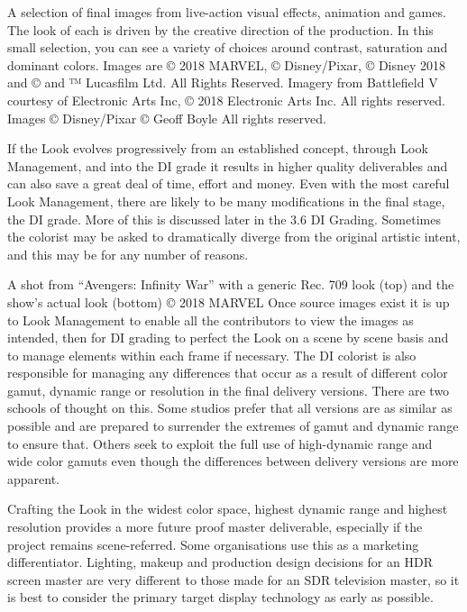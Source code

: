 A selection of final images from live-action visual effects, animation and games. The look of each is driven by the creative direction of the production. In this small selection, you can see a variety of choices around contrast, saturation and dominant colors.
Images are © 2018 MARVEL, © Disney/Pixar,  © Disney 2018 and © and ™ Lucasfilm Ltd. All Rights Reserved. Imagery from Battlefield V courtesy of Electronic Arts Inc, © 2018 Electronic Arts Inc. All rights reserved. Images © Disney/Pixar © Geoff Boyle All rights reserved.

If the Look evolves progressively from an established concept, through Look Management, and into the DI grade it results in higher quality deliverables and can also save a great deal of time, effort and money. Even with the most careful Look Management, there are likely to be many modifications in the final stage, the DI grade. More of this is discussed later in the 3.6 DI Grading. Sometimes the colorist may be asked to dramatically diverge from the original artistic intent, and this may be for any number of reasons. 





A shot from “Avengers: Infinity War” with a generic Rec. 709 look (top) and the show’s actual look (bottom)
© 2018 MARVEL
Once source images exist it is up to Look Management to enable all the contributors to view the images as intended, then for DI grading to perfect the Look on a scene by scene basis and to manage elements within each frame if necessary. The DI colorist is also responsible for managing any differences that occur as a result of different color gamut, dynamic range or resolution in the final delivery versions. There are two schools of thought on this. Some studios prefer that all versions are as similar as possible and are prepared to surrender the extremes of gamut and dynamic range to ensure that. Others seek to exploit the full use of high-dynamic range and wide color gamuts even though the differences between delivery versions are more apparent.

Crafting the Look in the widest color space, highest dynamic range and highest resolution provides a more future proof master deliverable, especially if the project remains scene-referred. Some organisations use this as a marketing differentiator. Lighting, makeup and production design decisions for an HDR screen master are very different to those made for an SDR television master, so it is best to consider the primary target display technology as early as possible.



